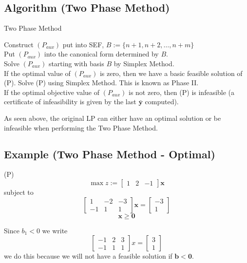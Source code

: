 \begin{algbox}
    \subsection{Algorithm (Two Phase Method)}
    \begin{algorithm}[H]
        \caption{Two Phase Method}
        Construct $ (P_{aux}) $ put into SEF, $ B:=\{n+1,n+2,\ldots,n+m\} $\\
        Put $ (P_{aux}) $ into the canonical form determined by $ B $.\\
        Solve $ (P_{aux}) $ starting with basis $ B $ by Simplex Method.\\
        If the optimal value of $ (P_{aux}) $ is zero, then we have a basic
        feasible solution of (P). Solve (P) using Simplex Method. This is
        known as Phase II.\\
        If the optimal objective value of $ (P_{aux}) $ is not zero, then
        (P) is infeasible (a certificate of infeasibility is given by
        the last $ \bm{\bar{y}} $ computed).\\
    \end{algorithm}
\end{algbox}
As seen above, the original LP can either have an optimal
solution or be infeasible when performing the Two Phase Method.

\subsection{Example (Two Phase Method - Optimal)}
(P)
\[ \max z:= \begin{bmatrix} 1 & 2 & -1 \end{bmatrix} \bm{x} \]
subject to
\[
    \begin{bmatrix}
        1 & -2 & -3\\
        -1 & 1 & 1
    \end{bmatrix}
    \bm{x} =
    \begin{bmatrix}
        -3\\
        1
    \end{bmatrix}
\]
\[ \bm{x}\ge \bm{0} \]

Since $ b_1<0 $
we write
\[ \begin{bmatrix}
    -1 & 2 & 3\\
    -1 & 1 & 1
\end{bmatrix}
x=
\begin{bmatrix}
    3\\
    1
\end{bmatrix}
\]
we do this because we will not have a feasible solution if $ \bm{b}<\bm{0} $.

